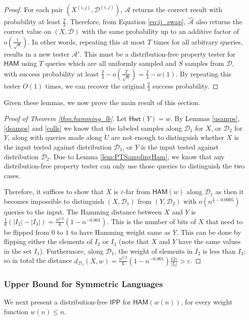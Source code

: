 \documentclass[10pt,a4paper]{article}
\newcommand{\Hamming}{\mathsf{Hwt}}
\newcommand{\HAM}{\mathsf{HAM}}
\newcommand{\IPP}{\mathsf{IPP}}
\newcommand{\sD}{\mathcal{D}}
\newcommand{\sA}{\mathcal{A}}
\begin{document}
\begin{proof}
For each pair $(X^{(i,j)},\mathcal{D}^{(i,j)})$, $\mathcal{A}$ returns the correct result with probability at least $\frac{2}{3}$. Therefore, from Equation \ref{eq:ij_swap}, $\hat{\sA}$ also returns the correct value on $(X,\mathcal{D})$ with the same probability up to an additive factor of $o\left(\frac{1}{\sqrt{n}}\right)$. In other words, repeating this at most $T$ times for all arbitrary queries, results in a new tester $\sA'$. This must be a distribution-free property tester for $\HAM$ using $T$ queries which are all uniformly sampled and $S$ samples from $\sD$, with success probability at least $\frac{2}{3}-o\left(\frac{T}{\sqrt{n}}\right)=\frac{2}{3}-o(1)$. By repeating this tester $O(1)$ times, we can recover the original $\frac{2}{3}$ success probability.
\end{proof}

\noindent Given these lemmas, we now prove the main result of this section.
\begin{proof}[Proof of Theorem \ref{thm:hamming_lb}]
Let $\Hamming(Y) = w$. By Lemmas \ref{usamps}, \ref{dsamps} and \ref{colls} we know that the labeled samples along $\sD_{1}$ for $X$, or $\sD_{2}$ for $Y$, along with queries made along $U$ are not enough to distinguish whether $X$ is the input tested against distribution $\mathcal{D}_{1}$, or $Y$ is the input tested against distribution $\mathcal{D}_{2}$. Due to Lemma \ref{lem:PTSamplingHam}, we know that any distribution-free property tester can only use those queries to distinguish the two cases. 

Therefore, it suffices to show that $X$ is $\varepsilon$-far from $\HAM(w)$ along $\mathcal{D}_{1}$ as then it becomes impossible to distinguish $(X, \mathcal{D}_{1})$ from $(Y, \mathcal{D}_{2})$ with $o(n^{\frac{1}{3}-0.0005})$ queries to the input. The Hamming distance between $X$ and $Y$ is $\frac{1}{6}(|I_{2}|-|I_{3}|)=\frac{n^{2/3}}{6}(1-n^{-0.001})$. This is the number of bits of $X$ that need to be flipped from $0$ to $1$ to have Hamming weight same as $Y$. This can be done by flipping either the elements of $I_{2}$ or $I_{3}$ (note that $X$ and $Y$ have the same values in the set $I_{1}$). Furthermore, along $\sD_{1}$, the weight of elements in $I_{2}$ is less than $I_{3}$; so in total the distance $d_{\sD_{1}}(X, w)=\frac{n^{2/3}}{6}(1-n^{-0.001}) \frac{12\varepsilon}{|I_{2}|}>\varepsilon$.
\end{proof}
\subsubsection{Upper Bound for Symmetric Languages}
\label{sec:hamming}
We next present a distribution-free $\IPP$ for $\HAM(w(n))$, for every weight function $w(n) \leq n$. 
\end{document}
